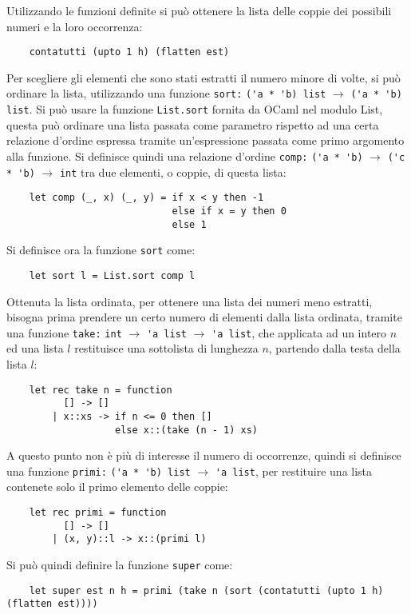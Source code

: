 \documentclass{article}
\numberwithin{equation}{subsection}
\begin{document}
Utilizzando le funzioni definite si può ottenere la lista delle coppie dei possibili numeri e la loro occorrenza:
\begin{verbatim}
    contatutti (upto 1 h) (flatten est)    
\end{verbatim}

Per scegliere gli elementi che sono stati estratti il numero minore di volte, si può ordinare la lista, utilizzando una funzione \verb|sort:| \verb|('a * 'b) list| $\rightarrow$ \verb|('a * 'b) list|. Si può usare la funzione \verb|List.sort| fornita da OCaml nel modulo List, questa può ordinare una lista passata come parametro rispetto ad una certa relazione d'ordine espressa tramite un'espressione passata come primo argomento alla funzione. Si definisce quindi una relazione d'ordine \verb|comp:| \verb|('a * 'b)| $\rightarrow$ \verb|('c * 'b)| $\rightarrow$ \verb|int| tra due elementi, o coppie, di questa lista:
\begin{verbatim}
    let comp (_, x) (_, y) = if x < y then -1
                             else if x = y then 0
                             else 1
\end{verbatim}
Si definisce ora la funzione \verb|sort| come:
\begin{verbatim}
    let sort l = List.sort comp l
\end{verbatim}


Ottenuta la lista ordinata, per ottenere una lista dei numeri meno estratti, bisogna prima prendere un certo numero di elementi dalla lista ordinata, tramite una funzione \verb|take:| \verb|int| $\rightarrow$ \verb|'a list| $\rightarrow$ \verb|'a list|, che applicata ad un intero $n$ ed una lista $l$ restituisce una sottolista di lunghezza $n$, partendo dalla testa della lista $l$:
\begin{verbatim}
    let rec take n = function
          [] -> []
        | x::xs -> if n <= 0 then []
                   else x::(take (n - 1) xs)
\end{verbatim}
A questo punto non è più di interesse il numero di occorrenze, quindi si definisce una funzione \verb|primi:| \verb|('a * 'b) list| $\rightarrow$ \verb|'a list|, per restituire una lista contenete solo il primo elemento delle coppie:
\begin{verbatim}
    let rec primi = function
          [] -> []
        | (x, y)::l -> x::(primi l)
\end{verbatim}

Si può quindi definire la funzione \verb|super| come:
\begin{verbatim}
    let super est n h = primi (take n (sort (contatutti (upto 1 h) (flatten est))))    
\end{verbatim}
\end{document}
